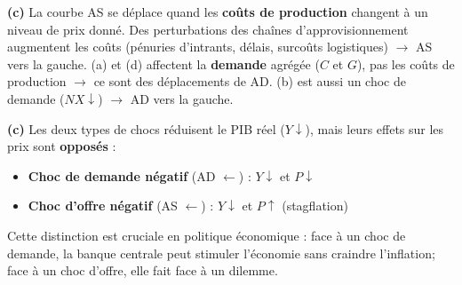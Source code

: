 \begin{reponse}
\textbf{(c)} La courbe AS se déplace quand les \textbf{coûts de production} changent à un niveau de prix donné. Des perturbations des chaînes d'approvisionnement augmentent les coûts (pénuries d'intrants, délais, surcoûts logistiques) $\to$ AS vers la gauche. (a) et (d) affectent la \textbf{demande} agrégée ($C$ et $G$), pas les coûts de production $\to$ ce sont des déplacements de AD. (b) est aussi un choc de demande ($NX \downarrow$) $\to$ AD vers la gauche.
\end{reponse}


\begin{reponse}
\textbf{(c)} Les deux types de chocs réduisent le PIB réel ($Y \downarrow$), mais leurs effets sur les prix sont \textbf{opposés} :
\begin{itemize}
   \item \textbf{Choc de demande négatif} (AD $\leftarrow$) : $Y \downarrow$ et $P \downarrow$
   \item \textbf{Choc d'offre négatif} (AS $\leftarrow$) : $Y \downarrow$ et $P \uparrow$ (stagflation)
\end{itemize}
Cette distinction est cruciale en politique économique : face à un choc de demande, la banque centrale peut stimuler l'économie sans craindre l'inflation; face à un choc d'offre, elle fait face à un dilemme.
\end{reponse}


